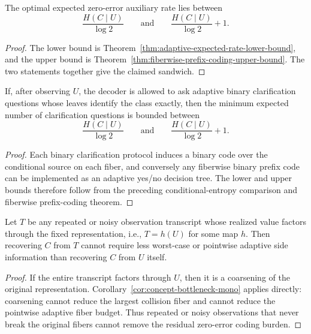 \begin{corollary}\label{cor:zero-error-conditional-entropy-sandwich}
The optimal expected zero-error auxiliary rate lies between
\[
\frac{H(C\mid U)}{\log 2}
\qquad\text{and}\qquad
\frac{H(C\mid U)}{\log 2}+1.
\]
\end{corollary}

\begin{proof}
The lower bound is Theorem~\ref{thm:adaptive-expected-rate-lower-bound}, and the upper bound is Theorem~\ref{thm:fiberwise-prefix-coding-upper-bound}. The two statements together give the claimed sandwich.
\end{proof}

\begin{corollary}
If, after observing $U$, the decoder is allowed to ask adaptive binary clarification questions whose leaves identify the class exactly, then the minimum expected number of clarification questions is bounded between
\[
\frac{H(C\mid U)}{\log 2}
\qquad\text{and}\qquad
\frac{H(C\mid U)}{\log 2}+1.
\]
\end{corollary}

\begin{proof}
Each binary clarification protocol induces a binary code over the conditional source on each fiber, and conversely any fiberwise binary prefix code can be implemented as an adaptive yes/no decision tree. The lower and upper bounds therefore follow from the preceding conditional-entropy comparison and fiberwise prefix-coding theorem.
\end{proof}

\begin{corollary}
Let $T$ be any repeated or noisy observation transcript whose realized value factors through the fixed representation, i.e., $T = h(U)$ for some map $h$. Then recovering $C$ from $T$ cannot require less worst-case or pointwise adaptive side information than recovering $C$ from $U$ itself.
\end{corollary}

\begin{proof}
If the entire transcript factors through $U$, then it is a coarsening of the original representation. Corollary~\ref{cor:concept-bottleneck-mono} applies directly: coarsening cannot reduce the largest collision fiber and cannot reduce the pointwise adaptive fiber budget. Thus repeated or noisy observations that never break the original fibers cannot remove the residual zero-error coding burden.
\end{proof}

